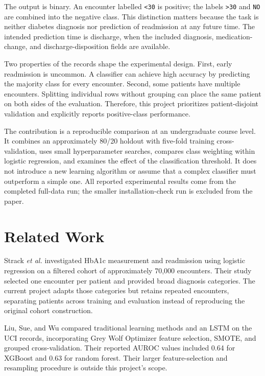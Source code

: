 \documentclass[conference]{IEEEtran}
\begin{document}
The output is binary. An encounter labelled \texttt{<30} is positive; the labels \texttt{>30} and \texttt{NO} are combined into the negative class. This distinction matters because the task is neither diabetes diagnosis nor prediction of readmission at any future time. The intended prediction time is discharge, when the included diagnosis, medication-change, and discharge-disposition fields are available.

Two properties of the records shape the experimental design. First, early readmission is uncommon. A classifier can achieve high accuracy by predicting the majority class for every encounter. Second, some patients have multiple encounters. Splitting individual rows without grouping can place the same patient on both sides of the evaluation. Therefore, this project prioritizes patient-disjoint validation and explicitly reports positive-class performance.

The contribution is a reproducible comparison at an undergraduate course level. It combines an approximately 80/20 holdout with five-fold training cross-validation, uses small hyperparameter searches, compares class weighting within logistic regression, and examines the effect of the classification threshold. It does not introduce a new learning algorithm or assume that a complex classifier must outperform a simple one. All reported experimental results come from the completed full-data run; the smaller installation-check run is excluded from the paper.

\section{Related Work}
Strack \emph{et al.} \cite{strack} investigated HbA1c measurement and readmission using logistic regression on a filtered cohort of approximately 70,000 encounters. Their study selected one encounter per patient and provided broad diagnosis categories. The current project adapts those categories but retains repeated encounters, separating patients across training and evaluation instead of reproducing the original cohort construction.

Liu, Sue, and Wu \cite{liu} compared traditional learning methods and an LSTM on the UCI records, incorporating Grey Wolf Optimizer feature selection, SMOTE, and grouped cross-validation. Their reported AUROC values included 0.64 for XGBoost and 0.63 for random forest. Their larger feature-selection and resampling procedure is outside this project's scope.
\end{document}
